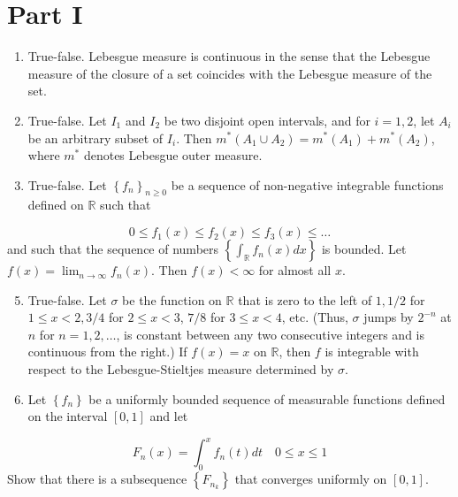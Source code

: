 \documentclass[10pt]{article}
\begin{document}
\section{Part I}
\begin{enumerate}
  \item True-false. Lebesgue measure is continuous in the sense that the Lebesgue measure of the closure of a set coincides with the Lebesgue measure of the set.

  \item True-false. Let $I_{1}$ and $I_{2}$ be two disjoint open intervals, and for $i=1,2$, let $A_{i}$ be an arbitrary subset of $I_{i}$. Then $m^{*}\left(A_{1} \cup A_{2}\right)=m^{*}\left(A_{1}\right)+m^{*}\left(A_{2}\right)$, where $m^{*}$ denotes Lebesgue outer measure.

  \item True-false. Let $\left\{f_{n}\right\}_{n \geq 0}$ be a sequence of non-negative integrable functions defined on $\mathbb{R}$ such that

\end{enumerate}
$$
0 \leq f_{1}(x) \leq f_{2}(x) \leq f_{3}(x) \leq \ldots
$$
and such that the sequence of numbers $\left\{\int_{\mathbb{R}} f_{n}(x) d x\right\}$ is bounded. Let $f(x)=\lim _{n \rightarrow \infty} f_{n}(x)$. Then $f(x)<\infty$ for almost all $x .$

\begin{enumerate}
  \setcounter{enumi}{4}
  \item True-false. Let $\sigma$ be the function on $\mathbb{R}$ that is zero to the left of $1,1 / 2$ for $1 \leq x<2,3 / 4$ for $2 \leq x<3$, $7 / 8$ for $3 \leq x<4$, etc. (Thus, $\sigma$ jumps by $2^{-n}$ at $n$ for $n=1,2, \ldots$, is constant between any two consecutive integers and is continuous from the right.) If $f(x)=x$ on $\mathbb{R}$, then $f$ is integrable with respect to the Lebesgue-Stieltjes measure determined by $\sigma$.

  \item Let $\left\{f_{n}\right\}$ be a uniformly bounded sequence of measurable functions defined on the interval $[0,1]$ and let

\end{enumerate}
$$
F_{n}(x)=\int_{0}^{x} f_{n}(t) d t \quad 0 \leq x \leq 1
$$
Show that there is a subsequence $\left\{F_{n_{k}}\right\}$ that converges uniformly on $[0,1]$.
\end{document}
